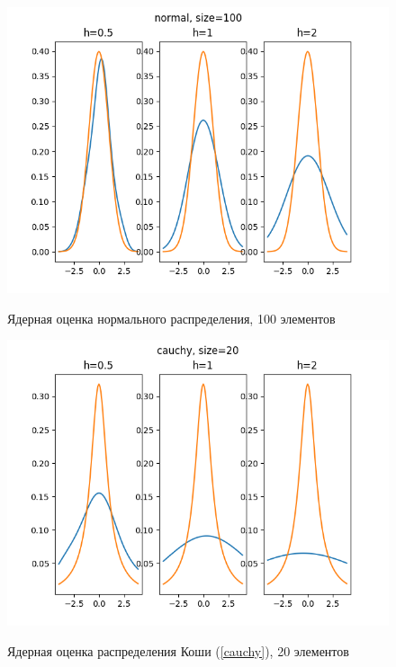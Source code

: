 \documentclass[12pt,a4paper]{article}
\begin{document}
			\begin{figure}[htp]
				{\includegraphics[width=1\linewidth]{../plots/normal_100.png}}
				\caption{Ядерная оценка нормального распределения, 100 элементов}
			\end{figure}
			\begin{figure}
				{\includegraphics[width=1\linewidth]{../plots/cauchy_20.png}}
				\caption{Ядерная оценка распределения Коши (\ref{cauchy}), 20 элементов}
			\end{figure}
			\newpage
			
\end{document}
